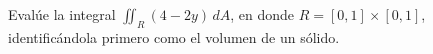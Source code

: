 \item Evalúe la integral $\iint_R (4 - 2y) \, dA$, en donde $R = [0, 1] \times [0, 1]$, identificándola primero como el volumen de un sólido.
